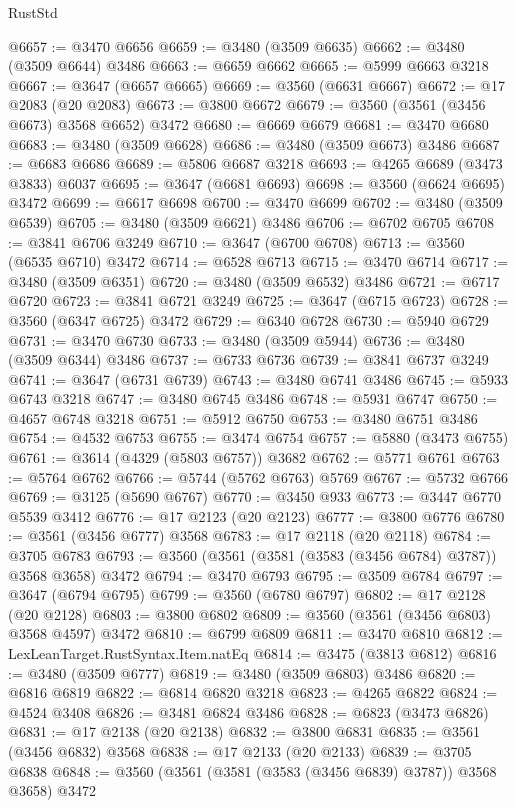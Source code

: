 \begin{lexlean}{RustStd}
\begin{coremodule}
@6657 := @3470 @6656
@6659 := @3480 (@3509 @6635)
@6662 := @3480 (@3509 @6644) @3486
@6663 := @6659 @6662
@6665 := @5999 @6663 @3218
@6667 := @3647 (@6657 @6665)
@6669 := @3560 (@6631 @6667)
@6672 := @17 @2083 (@20 @2083)
@6673 := @3800 @6672
@6679 := @3560 (@3561 (@3456 @6673) @3568 @6652) @3472
@6680 := @6669 @6679
@6681 := @3470 @6680
@6683 := @3480 (@3509 @6628)
@6686 := @3480 (@3509 @6673) @3486
@6687 := @6683 @6686
@6689 := @5806 @6687 @3218
@6693 := @4265 @6689 (@3473 @3833) @6037
@6695 := @3647 (@6681 @6693)
@6698 := @3560 (@6624 @6695) @3472
@6699 := @6617 @6698
@6700 := @3470 @6699
@6702 := @3480 (@3509 @6539)
@6705 := @3480 (@3509 @6621) @3486
@6706 := @6702 @6705
@6708 := @3841 @6706 @3249
@6710 := @3647 (@6700 @6708)
@6713 := @3560 (@6535 @6710) @3472
@6714 := @6528 @6713
@6715 := @3470 @6714
@6717 := @3480 (@3509 @6351)
@6720 := @3480 (@3509 @6532) @3486
@6721 := @6717 @6720
@6723 := @3841 @6721 @3249
@6725 := @3647 (@6715 @6723)
@6728 := @3560 (@6347 @6725) @3472
@6729 := @6340 @6728
@6730 := @5940 @6729
@6731 := @3470 @6730
@6733 := @3480 (@3509 @5944)
@6736 := @3480 (@3509 @6344) @3486
@6737 := @6733 @6736
@6739 := @3841 @6737 @3249
@6741 := @3647 (@6731 @6739)
@6743 := @3480 @6741 @3486
@6745 := @5933 @6743 @3218
@6747 := @3480 @6745 @3486
@6748 := @5931 @6747
@6750 := @4657 @6748 @3218
@6751 := @5912 @6750
@6753 := @3480 @6751 @3486
@6754 := @4532 @6753
@6755 := @3474 @6754
@6757 := @5880 (@3473 @6755)
@6761 := @3614 (@4329 (@5803 @6757)) @3682
@6762 := @5771 @6761
@6763 := @5764 @6762
@6766 := @5744 (@5762 @6763) @5769
@6767 := @5732 @6766
@6769 := @3125 (@5690 @6767)
@6770 := @3450 @933
@6773 := @3447 @6770 @5539 @3412
@6776 := @17 @2123 (@20 @2123)
@6777 := @3800 @6776
@6780 := @3561 (@3456 @6777) @3568
@6783 := @17 @2118 (@20 @2118)
@6784 := @3705 @6783
@6793 := @3560 (@3561 (@3581 (@3583 (@3456 @6784) @3787)) @3568 @3658) @3472
@6794 := @3470 @6793
@6795 := @3509 @6784
@6797 := @3647 (@6794 @6795)
@6799 := @3560 (@6780 @6797)
@6802 := @17 @2128 (@20 @2128)
@6803 := @3800 @6802
@6809 := @3560 (@3561 (@3456 @6803) @3568 @4597) @3472
@6810 := @6799 @6809
@6811 := @3470 @6810
@6812 := LexLeanTarget.RustSyntax.Item.natEq
@6814 := @3475 (@3813 @6812)
@6816 := @3480 (@3509 @6777)
@6819 := @3480 (@3509 @6803) @3486
@6820 := @6816 @6819
@6822 := @6814 @6820 @3218
@6823 := @4265 @6822
@6824 := @4524 @3408
@6826 := @3481 @6824 @3486
@6828 := @6823 (@3473 @6826)
@6831 := @17 @2138 (@20 @2138)
@6832 := @3800 @6831
@6835 := @3561 (@3456 @6832) @3568
@6838 := @17 @2133 (@20 @2133)
@6839 := @3705 @6838
@6848 := @3560 (@3561 (@3581 (@3583 (@3456 @6839) @3787)) @3568 @3658) @3472

\end{coremodule}
\end{lexlean}
